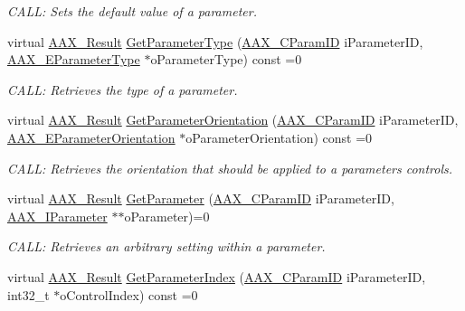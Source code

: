 \begin{Indent}
\begin{DoxyCompactItemize}
\begin{DoxyCompactList}\small\item\em C\+A\+LL\+: Sets the default value of a parameter. \end{DoxyCompactList}\item 
virtual \mbox{\hyperlink{a00392_a4d8f69a697df7f70c3a8e9b8ee130d2f}{A\+A\+X\+\_\+\+Result}} \mbox{\hyperlink{a01669_ae7f6d803fa9a472a4bad583868e3b951}{Get\+Parameter\+Type}} (\mbox{\hyperlink{a00392_a1440c756fe5cb158b78193b2fc1780d1}{A\+A\+X\+\_\+\+C\+Param\+ID}} i\+Parameter\+ID, \mbox{\hyperlink{a00491_a4cd0f189daa9a60cf36883c56344bb2e}{A\+A\+X\+\_\+\+E\+Parameter\+Type}} $\ast$o\+Parameter\+Type) const =0
\begin{DoxyCompactList}\small\item\em C\+A\+LL\+: Retrieves the type of a parameter. \end{DoxyCompactList}\item 
virtual \mbox{\hyperlink{a00392_a4d8f69a697df7f70c3a8e9b8ee130d2f}{A\+A\+X\+\_\+\+Result}} \mbox{\hyperlink{a01669_ac122e1a693296b059dca4350a5ff1dfe}{Get\+Parameter\+Orientation}} (\mbox{\hyperlink{a00392_a1440c756fe5cb158b78193b2fc1780d1}{A\+A\+X\+\_\+\+C\+Param\+ID}} i\+Parameter\+ID, \mbox{\hyperlink{a00491_a52f91d1c14aa5dceedabfb9d2de31bf0}{A\+A\+X\+\_\+\+E\+Parameter\+Orientation}} $\ast$o\+Parameter\+Orientation) const =0
\begin{DoxyCompactList}\small\item\em C\+A\+LL\+: Retrieves the orientation that should be applied to a parameter\textquotesingle{}s controls. \end{DoxyCompactList}\item 
virtual \mbox{\hyperlink{a00392_a4d8f69a697df7f70c3a8e9b8ee130d2f}{A\+A\+X\+\_\+\+Result}} \mbox{\hyperlink{a01669_a169b7e9fe64f2d86d20fffc152b5e365}{Get\+Parameter}} (\mbox{\hyperlink{a00392_a1440c756fe5cb158b78193b2fc1780d1}{A\+A\+X\+\_\+\+C\+Param\+ID}} i\+Parameter\+ID, \mbox{\hyperlink{a01857}{A\+A\+X\+\_\+\+I\+Parameter}} $\ast$$\ast$o\+Parameter)=0
\begin{DoxyCompactList}\small\item\em C\+A\+LL\+: Retrieves an arbitrary setting within a parameter. \end{DoxyCompactList}\item 
virtual \mbox{\hyperlink{a00392_a4d8f69a697df7f70c3a8e9b8ee130d2f}{A\+A\+X\+\_\+\+Result}} \mbox{\hyperlink{a01669_aff1ff6b27973200429f057dc003f30a8}{Get\+Parameter\+Index}} (\mbox{\hyperlink{a00392_a1440c756fe5cb158b78193b2fc1780d1}{A\+A\+X\+\_\+\+C\+Param\+ID}} i\+Parameter\+ID, int32\+\_\+t $\ast$o\+Control\+Index) const =0
$$
\end{DoxyCompactItemize}
\end{Indent}

